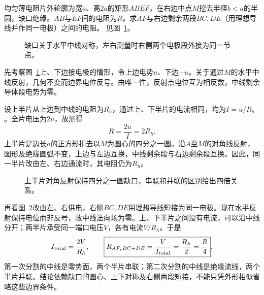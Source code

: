 \begin{example}[带半圆缺口的电阻片]\label{ex:c1-notch}
均匀薄电阻片外轮廓为宽$a$、高$2a$的矩形$ABEF$，在右边中点$M$挖去半径$b<a$的半圆，缺口绝缘。$AB$与$EF$间的电阻为$R$。求$AF$与右边剩余两段$BC,DE$（用理想导线并作同一电极）之间的电阻。 见图~\ref{fig:c1-notch-q}。
\end{example}

\begin{figure}[H]\centering
{}
\caption{缺口关于水平中线对称，左右测量时右侧两个电极段外接为同一节点。}\label{fig:c1-notch-q}
\end{figure}
\begin{solution}
先考察图~\ref{fig:c1-notch-q}上、下边接电极的情形，令上边电势$u$、下边$-u$。关于通过$M$的水平中线反射，几何不变而边界电位反号。由唯一性，反射点电位互为相反数，中线剩余导体段电势为零。

设上半片从上边到中线的电阻为$R_h$，通过上、下半片的电流相同，均为$I=u/R_h$。全片电压为$2u$，故测得
\[
 R=\frac{2u}I=2R_h.
\]
上半片是边长$a$的正方形扣去以$M$为圆心的四分之一圆。沿$A$至$M$的对角线反射，图形及绝缘圆弧不变，上边与左边互换，中线剩余段与右边剩余段互换。因此，同一半片改由左、右边通流时，其电阻仍为$R_h$。
\begin{figure}[H]\centering
{}
\caption{上半片对角反射保持四分之一圆缺口，串联和并联的区别给出四倍关系。}\label{fig:c1-notch-s}
\end{figure}
再看图~\ref{fig:c1-notch-s}改由左、右供电，右侧$BC,DE$用理想导线短接为同一电极。现在水平反射保持电位而非反号，故中线法向场为零。上、下半片之间没有电流，可以沿中线分开；两半片承受同一端口电压$V$，各有电流$V/R_h$。于是
\[
 I_{\rm total}=\frac{2V}{R_h},\qquad
 \boxed{R_{AF,\,BC+DE}=\frac V{I_{\rm total}}=\frac{R_h}{2}=\frac R4}.
\]
第一次分割的中线是零势面，两个半片串联；第二次分割的中线是绝缘流线，两个半片并联。结论依赖缺口的圆心、上下对称及右侧两段短接，不能只凭外形相似省略这些边界条件。
\end{solution}


